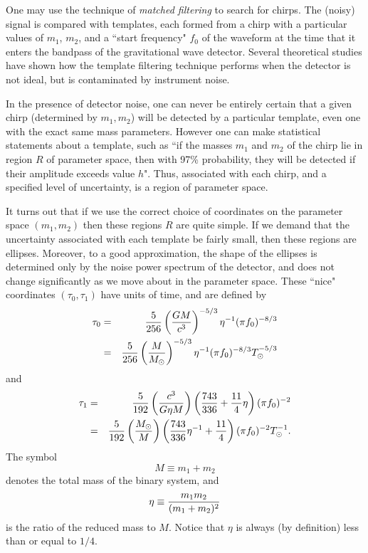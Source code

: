 One may use the technique of {\it matched filtering} to search for
chirps.  The (noisy) signal is compared with templates, each formed
from a  chirp with a particular values of $m_1$, $m_2$, and a ``start
frequency" $f_0$  of the waveform at the time that it enters the
bandpass of the gravitational wave detector. Several theoretical
studies \cite{Bala,Owen} have shown how the template filtering
technique performs when the detector is not ideal, but is contaminated by
instrument noise.

In the presence of detector noise, one can never be entirely certain
that a given chirp (determined by $m_1,m_2$) will be detected by a
particular template, even one with the exact same mass parameters.
However one can make statistical statements about a template, such as
``if the masses $m_1$ and $m_2$ of the chirp lie in region $R$ of
parameter space, then with 97\% probability, they will be detected if
their amplitude exceeds value $h$".  Thus, associated with each chirp,
and a specified level of uncertainty, is a region of parameter space.

It turns out that if we use the correct choice of coordinates on the
parameter space $(m_1,m_2)$ then these regions $R$ are quite simple.
If we demand that the uncertainty associated with each template be
fairly small, then these regions are ellipses.  Moreover, to a good
approximation, the shape of the ellipses is determined only by the
noise power spectrum of the detector, and does not change significantly
as we move about in the parameter space.  These ``nice" coordinates
$(\tau_0,\tau_1)$ have units of time, and are defined by
\begin{eqnarray}
\label{e:tau0}
\tau_0 &=& {5 \over 256} \left({ G M \over c^3}\right)^{-5/3} \eta^{-1}
(\pi f_0)^{-8/3} \\
\nonumber
&=& {5 \over 256}  \left({ M \over M_\odot}\right)^{-5/3}\eta^{-1} (\pi
f_0)^{-8/3} T_\odot^{-5/3}
\end{eqnarray}
and 
\begin{eqnarray}
\label{e:tau1}
\tau_1 &=& {5 \over 192} \left({c^3 \over G \eta M }\right) \left({743
\over 336} + {11 \over 4} \eta \right) (\pi f_0)^{-2}\\
\nonumber
&=& {5 \over 192} \left( {M_\odot \over  M }\right) \left({743 \over
336} \eta^{-1} + {11 \over 4} \right) (\pi f_0)^{-2} T_\odot^{-1}.
\end{eqnarray}
The symbol
\begin{equation}
M \equiv m_1+m_2
\end{equation}
denotes the total mass of the binary system, and
\begin{equation}
\eta \equiv {m_1 m_2 \over (m_1 + m_2)^2}
\end{equation}
is the ratio of the reduced
mass to $M$.  Notice that $\eta$ is always (by definition) less than or
equal to $1/4$.

